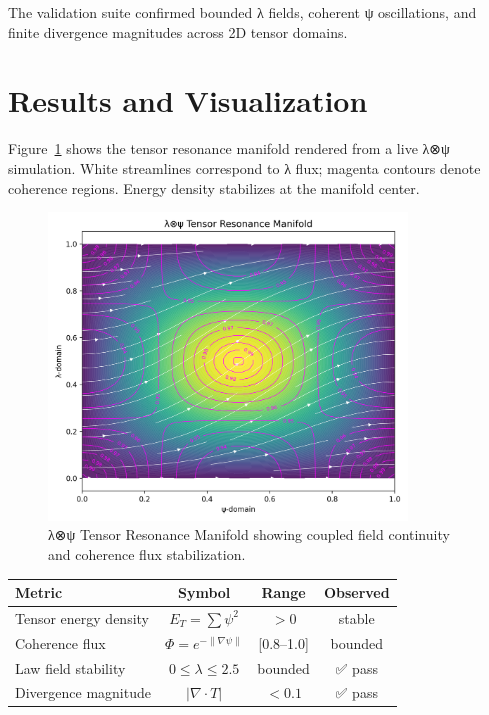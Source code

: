 \documentclass[11pt]{article}
\begin{document}
The validation suite confirmed bounded λ fields, coherent ψ oscillations, and finite divergence magnitudes across 2D tensor domains.

\section{Results and Visualization}
Figure~\ref{fig:tensorflow} shows the tensor resonance manifold rendered from a live λ⊗ψ simulation.  
White streamlines correspond to λ flux; magenta contours denote coherence regions.  
Energy density stabilizes at the manifold center.

\begin{figure}[h!]
\centering
\includegraphics[width=0.85\textwidth]{docs/figures/tensor_resonance_manifold.png}
\caption{λ⊗ψ Tensor Resonance Manifold showing coupled field continuity and coherence flux stabilization.}
\label{fig:tensorflow}
\end{figure}

\begin{center}
\renewcommand{\arraystretch}{1.2}
\begin{tabular}{lccc}
\toprule
\textbf{Metric} & \textbf{Symbol} & \textbf{Range} & \textbf{Observed}\\
\midrule
Tensor energy density & \( E_T = \sum \psi^2 \) & \( >0 \) & stable\\
Coherence flux & \( \Phi = e^{-\lVert\nabla\psi\rVert} \) & [0.8–1.0] & bounded\\
Law field stability & \( 0 \leq \lambda \leq 2.5 \) & bounded & ✅ pass\\
Divergence magnitude & \( |\nabla\cdot T| \) & \( <0.1 \) & ✅ pass\\
\bottomrule
\end{tabular}
\end{center}
\end{document}
